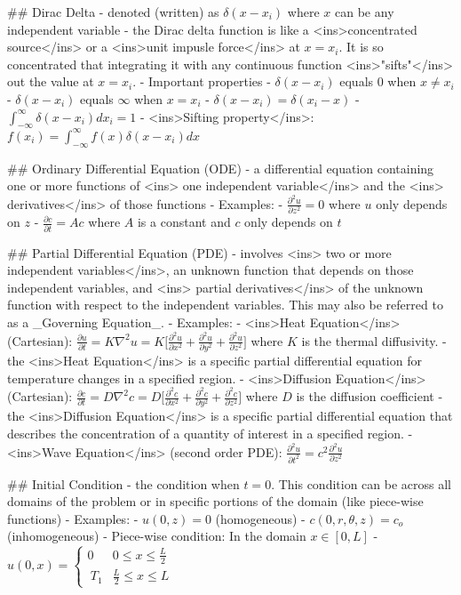 ## Dirac Delta
- denoted (written) as $\delta(x-x_i)$ where $x$ can be any independent variable
- the Dirac delta function is like a <ins>concentrated source</ins> or a <ins>unit impusle force</ins> at $x=x_i$. It is so concentrated that integrating it with any continuous function <ins>"sifts"</ins> out the value at $x=x_i$.
    - Important properties
        - $\delta(x-x_i)$ equals 0 when $x \neq x_i$
        - $\delta(x-x_i)$ equals $\infty$ when $x=x_i$
        - $\delta(x-x_i) = \delta(x_i-x)$
        - $\int_{-\infty}^{\infty} \delta(x-x_i) dx_i =1$
        - <ins>Sifting property</ins>: $f(x_i) = \int_{-\infty}^{\infty} f(x) \delta(x-x_i) dx$

## Ordinary Differential Equation (ODE)
- a differential equation containing one or more functions of <ins> one independent variable</ins> and the <ins> derivatives</ins> of those functions
    - Examples:
        - $\frac{\partial^2 u}{\partial z^2} = 0$ where $u$ only depends on $z$
        - $\frac{\partial c}{\partial t} = Ac$ where $A$ is a constant and $c$ only depends on $t$

## Partial Differential Equation (PDE)
- involves <ins> two or more independent variables</ins>, an unknown function that depends on those independent variables, and <ins> partial derivatives</ins> of the unknown function with respect to the independent variables. This may also be referred to as a _Governing Equation_.
    - Examples:
        - <ins>Heat Equation</ins> (Cartesian): $\frac{\partial u}{\partial t} = K \nabla^2u = K\biggl[\frac{\partial^2 u}{\partial x^2} + \frac{\partial^2 u}{\partial y^2} + \frac{\partial^2 u}{\partial z^2}\biggl]$ where $K$ is the thermal diffusivity.
            - the <ins>Heat Equation</ins> is a specific partial differential equation for temperature changes in a specified region.
        - <ins>Diffusion Equation</ins> (Cartesian): $\frac{\partial c}{\partial t} = D \nabla^2c = D\biggl[\frac{\partial^2 c}{\partial x^2} + \frac{\partial^2 c}{\partial y^2} + \frac{\partial^2 c}{\partial z^2}\biggl]$ where $D$ is the diffusion coefficient
            - the <ins>Diffusion Equation</ins> is a specific partial differential equation that describes the concentration of a quantity of interest in a specified region.
        - <ins>Wave Equation</ins> (second order PDE): $\frac{\partial^2 u}{\partial t^2} = c^2 \frac{\partial^2 u}{\partial z^2}$ 

## Initial Condition
- the condition when $t=0$. This condition can be across all domains of the problem or in specific portions of the domain (like piece-wise functions)
    - Examples:
        - $u(0,z) = 0$ (homogeneous)
        - $c(0,r,\theta,z) = c_o$ (inhomogeneous)
        - Piece-wise condition: In the domain $x \in [0,L]$
            - $u(0,x) = 
                \begin{cases} 
                    0 &0 \leq x \leq \frac{L}{2}\\\
                    T_1 &\frac{L}{2} \leq x \leq L
                \end{cases}$ 
        

